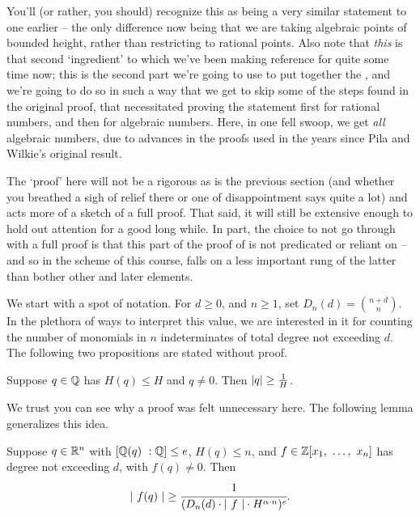 You'll (or rather, you should) recognize this as being a very similar statement to one earlier -- the only difference now being that we are taking algebraic points of bounded height, rather than restricting to rational points. Also note that \emph{this} is that second `ingredient' to which we've been making reference for quite some time now; this is the second part we're going to use to put together the \pwt, and we're going to do so in such a way that we get to skip some of the steps found in the original proof, that necessitated proving the statement first for rational numbers, and then for algebraic numbers. Here, in one fell swoop, we get \emph{all} algebraic numbers, due to advances in the proofs used in the years since Pila and Wilkie's original result.

The `proof' here will not be a rigorous as is the previous section (and whether you breathed a sigh of relief there or one of disappointment says quite a lot) and acts more of a sketch of a full proof. That said, it will still be extensive enough to hold out attention for a good long while. In part, the choice to not go through with a full proof is that this part of the proof of \pw is not predicated or reliant on \om -- and so in the scheme of this course, falls on a less important rung of the latter than bother other and later elements.

We start with a spot of notation. For $d \geq 0$, and $n \geq 1$, set $D_n(d) = \binom{n+d}{n}$. In the plethora of ways to interpret this value, we are interested in it for counting the number of monomials in $n$ indeterminates of total degree not exceeding $d$. The following two propositions are stated without proof.

\begin{proposition}
  Suppose $q \in \mathbb{Q}$ has $H(q) \leq H$ and $q \neq 0$. Then $\vert q\vert \geq \frac{1}{H}$.
\end{proposition}

We trust you can see why a proof was felt unnecessary here. The following lemma generalizes this idea.

\begin{lemma}
  Suppose $q \in \mathbb{R}^n$ with $[\mathbb{Q}(q) \ : \mathbb{Q}] \leq e$, $H(q) \leq n$, and $f \in \mathbb{Z}[x_1, \ \hdots, \ x_n]$ has degree not exceeding $d$, with $f(q) \neq 0$. Then
    \begin{align*}
      \left\vert \ f(q) \ \right\vert \geq \cfrac{1}{(D_n(d) \cdot \left\vert \ f \ \right\vert \cdot H^{\alpha \cdot n})^e}.
    \end{align*}
\end{lemma}

